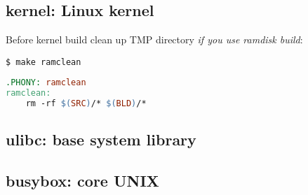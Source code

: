 \subsection{kernel: Linux kernel}

Before kernel build clean up TMP directory \emph{if you use ramdisk build}:
\begin{lstlisting}
$ make ramclean
\end{lstlisting}
\begin{lstlisting}[language=make,title=Makefile]
.PHONY: ramclean
ramclean:
	rm -rf $(SRC)/* $(BLD)/*
\end{lstlisting}

\subsection{ulibc: base system library}

\subsection{busybox: core UNIX}

